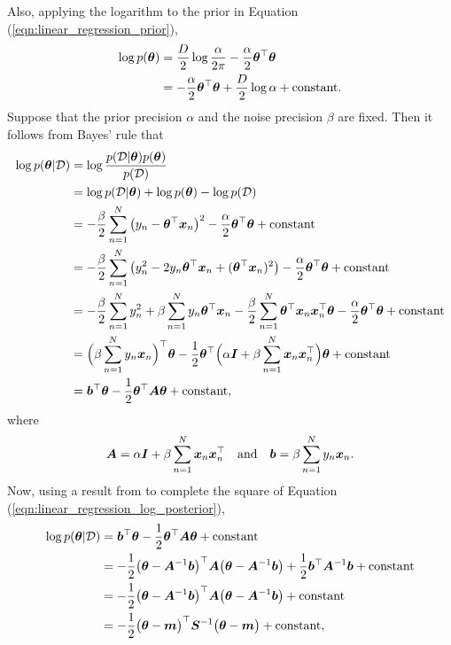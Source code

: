 \documentclass[10pt]{article} %
\begin{document}
Also, applying the logarithm to the prior in Equation (\ref{eqn:linear_regression_prior}),
\begin{align}
\begin{split}
	\log p({\bm{\theta}}) 
	& = \frac{D}{2} \log \frac{\alpha}{2\pi} - \frac{\alpha}{2} {\bm{\theta}}^\top {\bm{\theta}} \\
	& = -\frac{\alpha}{2} {\bm{\theta}}^\top {\bm{\theta}} + \frac{D}{2} \log \alpha + \text{constant}.
\end{split}
\end{align}
Suppose that the prior precision $\alpha$ and the noise precision $\beta$ are fixed. Then it follows from Bayes' rule that
\begin{align}
\label{eqn:linear_regression_log_posterior}
\begin{split}
	\log p({\bm{\theta}} | \mathcal{D}) 
	& = \log \frac{p(\mathcal{D} | {\bm{\theta}}) p({\bm{\theta}})}{p(\mathcal{D})} \\
	& = \log p(\mathcal{D} | {\bm{\theta}}) + \log p({\bm{\theta}}) - \log p(\mathcal{D}) \\
	& = -\frac{\beta}{2} \sum_{n=1}^N \big(y_n - {\bm{\theta}}^\top {\bm{x}}_n \big)^2 
	-\frac{\alpha}{2} {\bm{\theta}}^\top {\bm{\theta}} 
	+ \text{constant} \\
	& = -\frac{\beta}{2} \sum_{n=1}^N\big( y_n^2 - 2 y_n {\bm{\theta}}^\top {\bm{x}}_n + ({\bm{\theta}}^\top {\bm{x}}_n)^2 \big)
	-\frac{\alpha}{2} {\bm{\theta}}^\top {\bm{\theta}}
	+ \text{constant} \\
	& = -\frac{\beta}{2} \sum_{n=1}^N y_n^2
	+ \beta \sum_{n=1}^N y_n {\bm{\theta}}^\top {\bm{x}}_n
	-\frac{\beta}{2} \sum_{n=1}^N {\bm{\theta}}^\top {\bm{x}}_n {\bm{x}}_n^\top {\bm{\theta}}
	-\frac{\alpha}{2} {\bm{\theta}}^\top {\bm{\theta}}
	+ \text{constant} \\
	& = \Big(\beta \sum_{n=1}^N y_n {\bm{x}}_n \Big)^\top {\bm{\theta}} 
	-\frac{1}{2} {\bm{\theta}}^\top \Big( \alpha {\bm{I}} + \beta \sum_{n=1}^N {\bm{x}}_n {\bm{x}}_n^\top \Big) {\bm{\theta}} 
	+ \text{constant} \\
	& = {\bm{b}}^\top {\bm{\theta}} 
	- \frac{1}{2} {\bm{\theta}}^\top {\bm{A}} {\bm{\theta}} 
	+ \text{constant},
\end{split}
\end{align}
where 
\begin{equation}
    {\bm{A}} = \alpha {\bm{I}} + \beta \sum_{n=1}^N {\bm{x}}_n {\bm{x}}_n^\top \quad \text{and} \quad 
    {\bm{b}} = \beta \sum_{n=1}^N y_n {\bm{x}}_n.
\end{equation}
Now, using a result from \citep{barber2007} to complete the square of Equation (\ref{eqn:linear_regression_log_posterior}),
\begin{align}
\begin{split}
	\log p({\bm{\theta}} | \mathcal{D}) 
	& = {\bm{b}}^\top {\bm{\theta}} 
	- \frac{1}{2} {\bm{\theta}}^\top {\bm{A}} {\bm{\theta}} 
	+ \text{constant} \\
	& = -\frac{1}{2} \big({\bm{\theta}} - {\bm{A}}^{-1} {\bm{b}} \big)^\top {\bm{A}} \big({\bm{\theta}} - {\bm{A}}^{-1} {\bm{b}} \big)
	+ \frac{1}{2} {\bm{b}}^\top {\bm{A}}^{-1} {\bm{b}}
	+ \text{constant} \\
	& = -\frac{1}{2} \big({\bm{\theta}} - {\bm{A}}^{-1} {\bm{b}} \big)^\top {\bm{A}} \big({\bm{\theta}} - {\bm{A}}^{-1} {\bm{b}} \big)
	+ \text{constant} \\
	& = -\frac{1}{2} \big({\bm{\theta}} - {\bm{m}} \big)^\top {\bm{S}}^{-1} \big({\bm{\theta}} - {\bm{m}} \big)
	+ \text{constant},
\end{split}
\end{align}
\end{document}
